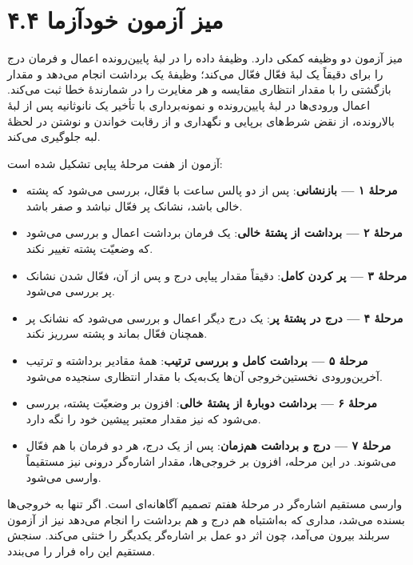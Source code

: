 \documentclass[12pt,a4paper]{article}
\begin{document}
	\section*{۴.۴ میز آزمون خودآزما}
	میز آزمون دو وظیفه کمکی دارد. وظیفهٔ  داده را در لبهٔ پایین‌رونده اعمال و فرمان درج را برای دقیقاً یک لبهٔ فعّال فعّال می‌کند؛ وظیفهٔ  یک برداشت انجام می‌دهد و مقدار بازگشتی را با مقدار انتظاری مقایسه و هر مغایرت را در شمارندهٔ خطا ثبت می‌کند. اعمال ورودی‌ها در لبهٔ پایین‌رونده و نمونه‌برداری با تأخیر یک نانوثانیه پس از لبهٔ بالارونده، از نقض شرط‌های برپایی و نگهداری و از رقابت خواندن و نوشتن در لحظهٔ لبه جلوگیری می‌کند.

	آزمون از هفت مرحلهٔ پیاپی تشکیل شده است:
	\begin{itemize}
		\item \textbf{مرحلهٔ ۱ --- بازنشانی}: پس از دو پالس ساعت با  فعّال، بررسی می‌شود که پشته خالی باشد، نشانک پر فعّال نباشد و  صفر باشد.
		\item \textbf{مرحلهٔ ۲ --- برداشت از پشتهٔ خالی}: یک فرمان برداشت اعمال و بررسی می‌شود که وضعیّت پشته تغییر نکند.
		\item \textbf{مرحلهٔ ۳ --- پر کردن کامل}: دقیقاً  مقدار پیاپی درج و پس از آن، فعّال شدن نشانک پر بررسی می‌شود.
		\item \textbf{مرحلهٔ ۴ --- درج در پشتهٔ پر}: یک درج دیگر اعمال و بررسی می‌شود که نشانک پر همچنان فعّال بماند و پشته سرریز نکند.
		\item \textbf{مرحلهٔ ۵ --- برداشت کامل و بررسی ترتیب}: همهٔ مقادیر برداشته و ترتیب آخرین‌ورودی نخستین‌خروجی آن‌ها یک‌به‌یک با مقدار انتظاری سنجیده می‌شود.
		\item \textbf{مرحلهٔ ۶ --- برداشت دوبارهٔ از پشتهٔ خالی}: افزون بر وضعیّت پشته، بررسی می‌شود که  نیز مقدار معتبر پیشین خود را نگه دارد.
		\item \textbf{مرحلهٔ ۷ --- درج و برداشت هم‌زمان}: پس از یک درج، هر دو فرمان با هم فعّال می‌شوند. در این مرحله، افزون بر خروجی‌ها، مقدار اشاره‌گر درونی نیز مستقیماً وارسی می‌شود.
	\end{itemize}

	وارسی مستقیم اشاره‌گر در مرحلهٔ هفتم تصمیم آگاهانه‌ای است. اگر تنها به خروجی‌ها بسنده می‌شد، مداری که به‌اشتباه هم درج و هم برداشت را انجام می‌دهد نیز از آزمون سربلند بیرون می‌آمد، چون اثر دو عمل بر اشاره‌گر یکدیگر را خنثی می‌کند. سنجش مستقیم  این راه فرار را می‌بندد.

\end{document}
